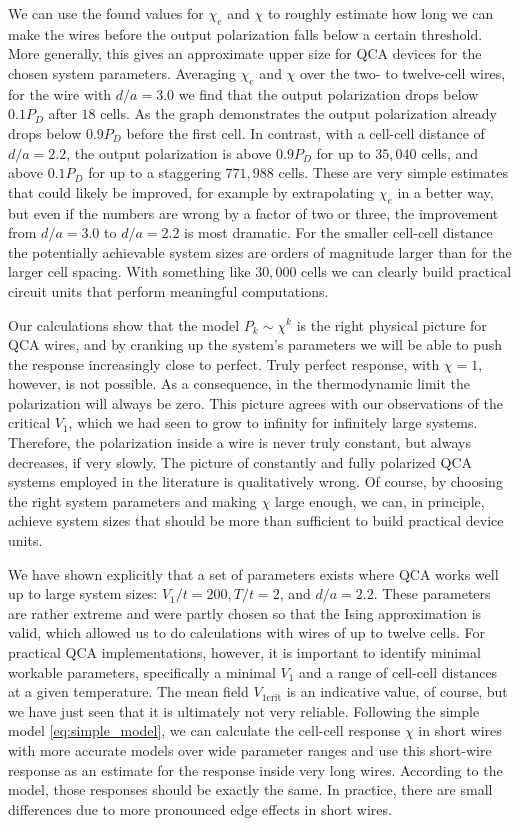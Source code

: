 We can use the found values for $\chi_e$ and $\chi$ to roughly estimate how long
we can make the wires before the output polarization falls below a certain
threshold. More generally, this gives an approximate upper size for QCA devices
for the chosen system parameters. Averaging $\chi_e$ and $\chi$ over the two- to
twelve-cell wires, for the wire with $d/a = 3.0$ we find that the output
polarization drops below $0.1 P_D$ after $18$ cells. As the graph demonstrates the
output polarization already drops below $0.9 P_D$ before the first cell. In
contrast, with a cell-cell distance of $d/a = 2.2$, the output polarization is
above $0.9 P_D$ for up to $35,040$ cells, and above $0.1 P_D$ for up to a
staggering $771,988$ cells. These are very simple estimates that could likely be
improved, for example by extrapolating $\chi_e$ in a better way, but even if the
numbers are wrong by a factor of two or three, the improvement from $d/a = 3.0$
to $d/a = 2.2$ is most dramatic. For the smaller cell-cell distance the
potentially achievable system sizes are orders of magnitude larger than for the
larger cell spacing. With something like $30,000$ cells we can clearly build
practical circuit units that perform meaningful computations.

Our calculations show that the model $P_k \sim \chi^k$ is the right physical
picture for QCA wires, and by cranking up the system's parameters
we will be able to push the response increasingly close to perfect. Truly
perfect response, with $\chi = 1$, however, is not possible. As a consequence, in the
thermodynamic limit the polarization will always be zero. This picture agrees
with our observations of the critical $V_1$, which we had seen to grow to
infinity for infinitely large systems. Therefore, the polarization inside a wire
is never truly constant, but always decreases, if very slowly. The picture of
constantly and fully polarized QCA systems employed in the literature is
qualitatively wrong. Of course, by choosing the right system parameters and
making $\chi$ large enough, we can, in principle, achieve system sizes that
should be more than sufficient to build practical device units. 

We have shown explicitly that a set of parameters exists where QCA works well up
to large system sizes: $V_1/t = 200, T/t = 2$, and $d/a = 2.2$. These parameters
are rather extreme and were partly chosen so that the Ising approximation is
valid, which allowed us to do calculations with wires of up to twelve cells. For
practical QCA implementations, however, it is important to identify minimal
workable parameters, specifically a minimal $V_1$ and a range of cell-cell
distances at a given temperature. The mean field $V_{1\textrm{crit}}$ is an indicative
value, of course, but we have just seen that it is ultimately not very reliable.
Following the simple model \eqref{eq:simple_model}, we can calculate the
cell-cell response $\chi$ in short wires with more accurate models over wide
parameter ranges and use this short-wire response as an estimate for the
response inside very long wires. According to the model, those responses should
be exactly the same. In practice, there are small differences due to more
pronounced edge effects in short wires.

